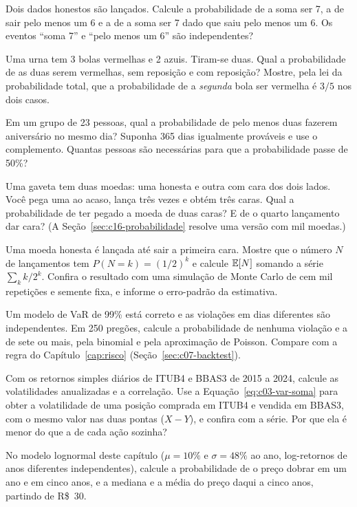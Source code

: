 \begin{exercicios}
  \item {} Dois dados honestos são lançados. Calcule a probabilidade de a soma ser 7, a de sair pelo menos um 6 e a de a soma ser 7 dado que saiu pelo menos um 6. Os eventos ``soma 7'' e ``pelo menos um 6'' são independentes?
  \item {} Uma urna tem 3 bolas vermelhas e 2 azuis. Tiram-se duas. Qual a probabilidade de as duas serem vermelhas, sem reposição e com reposição? Mostre, pela lei da probabilidade total, que a probabilidade de a \emph{segunda} bola ser vermelha é $3/5$ nos dois casos.
  \item\label{ex:c03-aniversario}  Em um grupo de 23 pessoas, qual a probabilidade de pelo menos duas fazerem aniversário no mesmo dia? Suponha 365 dias igualmente prováveis e use o complemento. Quantas pessoas são necessárias para que a probabilidade passe de 50\%?
  \item\label{ex:c03-moedas}  Uma gaveta tem duas moedas: uma honesta e outra com cara dos dois lados. Você pega uma ao acaso, lança três vezes e obtém três caras. Qual a probabilidade de ter pegado a moeda de duas caras? E de o quarto lançamento dar cara? (A Seção~\ref{sec:c16-probabilidade} resolve uma versão com mil moedas.)
  \item {} Uma moeda honesta é lançada até sair a primeira cara. Mostre que o número $N$ de lançamentos tem $P(N = k) = (1/2)^k$ e calcule $\operatorname{\mathbb{E}}[N]$ somando a série $\sum_k k/2^k$. Confira o resultado com uma simulação de Monte Carlo de cem mil repetições e semente fixa, e informe o erro-padrão da estimativa.
  \item {} Um modelo de VaR de 99\% está correto e as violações em dias diferentes são independentes. Em 250 pregões, calcule a probabilidade de nenhuma violação e a de sete ou mais, pela binomial e pela aproximação de Poisson. Compare com a regra do Capítulo~\ref{cap:risco} (Seção~\ref{sec:c07-backtest}).
  \item {} Com os retornos simples diários de ITUB4 e BBAS3 de 2015 a 2024, calcule as volatilidades anualizadas e a correlação. Use a Equação~\eqref{eq:c03-var-soma} para obter a volatilidade de uma posição comprada em ITUB4 e vendida em BBAS3, com o mesmo valor nas duas pontas ($X - Y$), e confira com a série. Por que ela é menor do que a de cada ação sozinha?
  \item {} No modelo lognormal deste capítulo ($\mu = 10\%$ e $\sigma = 48\%$ ao ano, log-retornos de anos diferentes independentes), calcule a probabilidade de o preço dobrar em um ano e em cinco anos, e a mediana e a média do preço daqui a cinco anos, partindo de R\$~30.

\end{exercicios}
